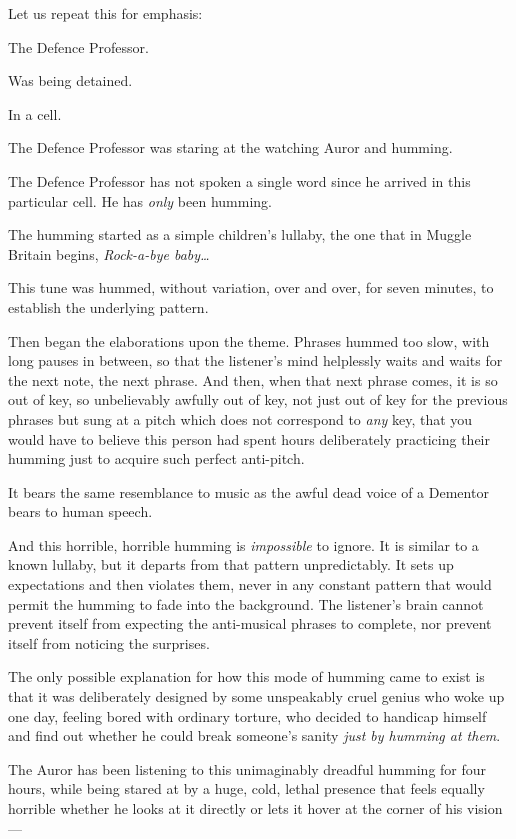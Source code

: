Let us repeat this for emphasis:

The Defence Professor.

Was being detained.

In a cell.

The Defence Professor was staring at the watching Auror and humming.

The Defence Professor has not spoken a single word since he arrived in this
particular cell. He has \emph{only} been humming.

The humming started as a simple children's lullaby, the one that in Muggle
Britain begins, \emph{Rock-a-bye baby{\ldots}}

This tune was hummed, without variation, over and over, for seven minutes, to
establish the underlying pattern.

Then began the elaborations upon the theme. Phrases hummed too slow, with long
pauses in between, so that the listener's mind helplessly waits and waits for
the next note, the next phrase. And then, when that next phrase comes, it is so
out of key, so unbelievably awfully out of key, not just out of key for the
previous phrases but sung at a pitch which does not correspond to \emph{any}
key, that you would have to believe this person had spent hours deliberately
practicing their humming just to acquire such perfect anti-pitch.

It bears the same resemblance to music as the awful dead voice of a Dementor
bears to human speech.

And this horrible, horrible humming is \emph{impossible} to ignore. It is
similar to a known lullaby, but it departs from that pattern unpredictably. It
sets up expectations and then violates them, never in any constant pattern that
would permit the humming to fade into the background. The listener's brain
cannot prevent itself from expecting the anti-musical phrases to complete, nor
prevent itself from noticing the surprises.

The only possible explanation for how this mode of humming came to exist is
that it was deliberately designed by some unspeakably cruel genius who woke up
one day, feeling bored with ordinary torture, who decided to handicap himself
and find out whether he could break someone's sanity \emph{just by humming at
them}.

The Auror has been listening to this unimaginably dreadful humming for four
hours, while being stared at by a huge, cold, lethal presence that feels
equally horrible whether he looks at it directly or lets it hover at the corner
of his vision---


